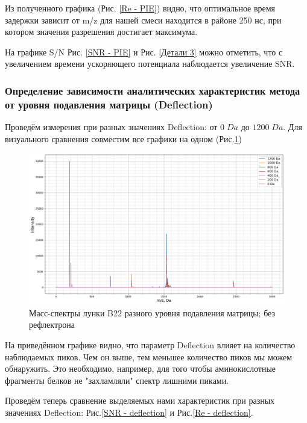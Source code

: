\documentclass{article}
\begin{document}
\par Из полученного графика (Рис. \ref{Re - PIE}) видно, что оптимальное время задержки зависит от m/z для нашей смеси находится в районе 250 нс, при котором значения разрешения достигает максимума. 

На графике S/N Рис. \ref{SNR - PIE} и Рис. \ref{Детали 3} можно отметить, что с увеличением времени ускоряющего потенциала наблюдается увеличение SNR.
\newpage
\subsubsection{Определение зависимости аналитических характеристик метода от уровня подавления матрицы (Deflection)}\; 
\par Проведём измерения при разных значениях Deflection: от $0 \; Da$ до $1200 \; Da$. Для визуального сравнения совместим все графики на одном (Рис.\ref{Deflection})
\begin{figure}[h!]
\centering
    \includegraphics[width=1\linewidth]{Images/Deflection.png}
    \caption{Масс-спектры лунки B22 разного уровня подавления матрицы; без рефлектрона}
    \label{Deflection}
\end{figure}

На приведённом графике видно, что параметр Deflection влияет на количество наблюдаемых пиков. Чем он выше, тем меньшее количество пиков мы можем обнаружить. Это необходимо, например, для того чтобы аминокислотные фрагменты белков не "захламляли" спектр лишними пиками. 

Проведём теперь сравнение выделяемых нами характеристик при разных значениях Deflection: Рис.\ref{SNR - deflection} и Рис.\ref{Re - deflection}.
\end{document}
